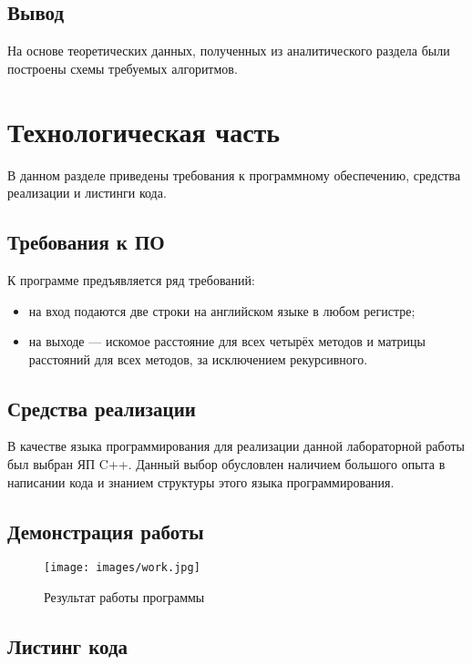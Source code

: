 \documentclass[a4paper,14pt, unknownkeysallowed]{extreport}
\begin{document}
\clearpage

\section{Вывод}

На основе теоретических данных, полученных из аналитического раздела были построены схемы требуемых алгоритмов.

\chapter{Технологическая часть}

В данном разделе приведены требования к программному обеспечению, средства реализации и листинги кода.

\section{Требования к ПО}

К программе предъявляется ряд требований:
\begin{itemize}
	\item на вход подаются две строки на английском языке в любом регистре;
	\item на выходе — искомое расстояние для всех четырёх методов и матрицы расстояний для всех методов, за исключением рекурсивного.
\end{itemize}

\section{Средства реализации}

В качестве языка программирования для реализации данной лабораторной работы был выбран ЯП C++. Данный выбор обусловлен наличием большого опыта в написании кода и знанием структуры этого языка программирования.

\section{Демонстрация работы}

\clearpage

\begin{figure}[h]
\centering
\texttt{[image: images/work.jpg]}
\caption{Результат работы программы}
\label{img:iterative_dl}
\end{figure}

\section{Листинг кода}
\end{document}
